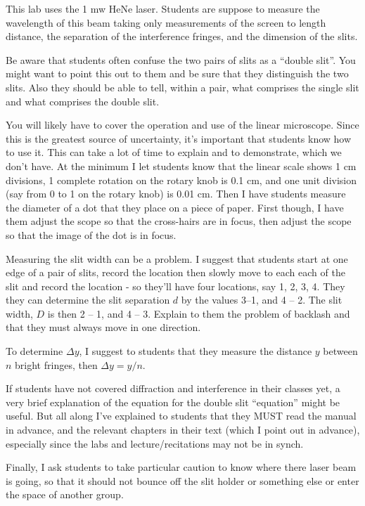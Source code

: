 This lab uses the 1 mw HeNe laser. Students are suppose to measure the wavelength of this beam taking only measurements of the screen to length distance, the separation of the interference fringes, and the dimension of the slits.

Be aware that students often confuse the two pairs of slits as a ``double slit''. You might want to point this out to them and be sure that they distinguish the two slits. Also they should be able to tell, within a pair, what comprises the single slit and what comprises the double slit.

You will likely have to cover the operation and use of the linear microscope. Since this is the greatest source of uncertainty, it's important that students know how to use it. This can take a lot of time to explain and to demonstrate, which we don't have. At the minimum I let students know that the linear scale shows 1 cm divisions, 1 complete rotation on the rotary knob is 0.1 cm, and one unit division (say from 0 to 1 on the rotary knob) is 0.01 cm. Then I have students measure the diameter of a dot that they place on a piece of paper. First though, I have them adjust the scope so that the cross-hairs are in focus, then adjust the scope so that the image of the dot is in focus.

Measuring the slit width can be a problem. I suggest that students start at one edge of a pair of slits, record the location then slowly move to each each of the slit and record the location - so they'll have four locations, say 1, 2, 3, 4. They they can determine the slit separation $d$ by the values 3--1, and 4 -- 2.  The slit width, $D$ is then 2 -- 1, and 4 -- 3. Explain to them the problem of backlash and that they must always move in one direction.

To determine $\Delta y$, I suggest to students that they measure  the distance $y$ between $n$ bright fringes, then $\Delta y = y/n$.

If students have not covered diffraction and interference in their classes yet, a very brief explanation of the equation for the double slit ``equation'' might be useful. But all along I've explained to students that they MUST read the manual in advance, and the relevant chapters in their text (which I point out in advance), especially since the labs and lecture/recitations may not be in synch. 

Finally, I ask students to take particular caution to know where there laser beam is going, so that it should not bounce off the slit holder or something else or enter the space of another group.

